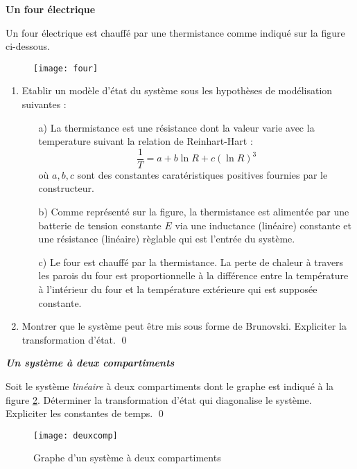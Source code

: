 \begin{exercice}{\bf Un four électrique}

Un four électrique est chauffé par une thermistance comme indiqué sur la figure ci-dessous.
\begin{figure}[h]
\begin{center}
\texttt{[image: four]}
\label{four}
\end{center}
\vspace{-5mm}
\end{figure}
\begin{enumerate}
\item Etablir un modèle d'état du système sous les hypothèses de modélisation suivantes :
\begin{itemize}
\item[a)] La thermistance est une résistance dont la valeur varie avec la temperature suivant la relation de Reinhart-Hart :
\begin{equation*}
\dfrac{1}{T} = a + b \ln R + c (\ln R)^3
\end{equation*}
où $a, b, c$ sont des constantes caratéristiques positives fournies par le constructeur.
\item [b)] Comme représenté sur la figure, la thermistance est alimentée par une batterie de tension constante $E$ via une inductance (linéaire) constante et une résistance (linéaire) règlable qui est l'entrée du système.
\item[c)] Le four est chauffé par la thermistance. La perte de chaleur à travers les parois du four est proportionnelle à la différence  entre la température à l'intérieur du four et la température extérieure qui est supposée constante. 
\end{itemize}
\item Montrer que le système peut être mis sous forme de Brunovski. Expliciter la transformation d'état. \qed
\end{enumerate}
\end{exercice}
\vv

\begin{exercice}{\bf \em Un système à deux compartiments}

Soit le système {\em linéaire} à deux compartiments dont le graphe
est indiqué à la figure \ref{Fig:deuxcomp}. Déterminer la transformation d'état qui diagonalise le
système. Expliciter les constantes de temps. \qed
\begin{figure}[h] 
   \centering
   \texttt{[image: deuxcomp]} 
   \caption{Graphe d'un système à deux compartiments}
   \label{Fig:deuxcomp}
\end{figure}
\end{exercice}

